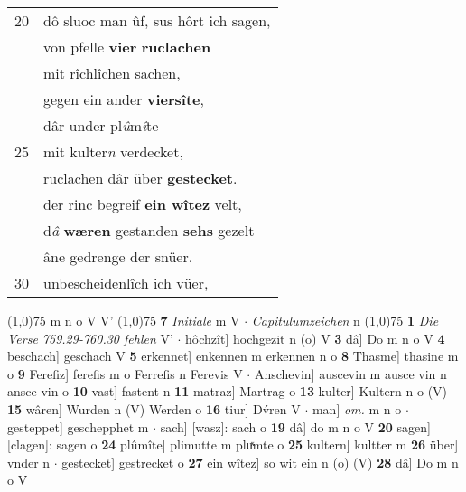 \documentclass[8pt,a4paper,notitlepage]{article}
\begin{document}
\begin{table}[ht]
\begin{minipage}[t]{0.5\linewidth}
\begin{tabular}{rl}
20 & dô sluoc man ûf, sus hôrt ich sagen,\\ 
 & von pfelle \textbf{vier} \textbf{ruclachen}\\ 
 & mit rîchlîchen sachen,\\ 
 & gegen ein ander \textbf{viersîte},\\ 
 & dâr under pl\textit{û}m\textit{î}te\\ 
25 & mit kulter\textit{n} verdecket,\\ 
 & ruclachen dâr über \textbf{gestecket}.\\ 
 & der rinc begreif \textbf{ein wîtez} velt,\\ 
 & d\textit{â} \textbf{wæren} gestanden \textbf{sehs} gezelt\\ 
 & âne gedrenge der snüer.\\ 
30 & unbescheidenlîch ich vüer,\\ 
\end{tabular}
\scriptsize
\line(1,0){75} \newline
m n o V V' \newline
\line(1,0){75} \newline
\textbf{7} \textit{Initiale} m V   $\cdot$ \textit{Capitulumzeichen} n  \newline
\line(1,0){75} \newline
\textbf{1} \textit{Die Verse 759.29-760.30 fehlen} V'   $\cdot$ hôchzît] hochgezit n (o) V \textbf{3} dâ] Do m n o V \textbf{4} beschach] geschach V \textbf{5} erkennet] enkennen m erkennen n o \textbf{8} Thasme] thasine m o \textbf{9} Ferefiz] ferefis m o Ferrefis n Ferevis V  $\cdot$ Anschevin] auscevin m ausce vin n ansce vin o \textbf{10} vast] fastent n \textbf{11} matraz] Martrag o \textbf{13} kulter] Kultern n o (V) \textbf{15} wâren] Wurden n (V) Werden o \textbf{16} tiur] Dv́ren V  $\cdot$ man] \textit{om.} m n o  $\cdot$ gesteppet] geschepphet m  $\cdot$ sach] [wasz]: sach o \textbf{19} dâ] do m n o V \textbf{20} sagen] [clagen]: sagen o \textbf{24} plûmîte] plimutte m pluͯmte o \textbf{25} kultern] kultter m \textbf{26} über] vnder n  $\cdot$ gestecket] gestrecket o \textbf{27} ein wîtez] so wit ein n (o) (V) \textbf{28} dâ] Do m n o V \newline
\end{minipage}
\end{table}
\newpage
\end{document}
